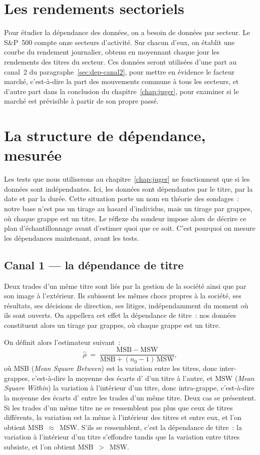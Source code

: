 \section{Les rendements sectoriels}
\label{sec:donnees-secteurs}

Pour étudier la dépendance des données, on a besoin de données par
secteur. Le S\&P~500 compte onze secteurs d'activité. Sur chacun d'eux,
on établit une courbe du rendement journalier, obtenu en moyennant
chaque jour les rendements des titres du secteur. Ces données seront
utilisées d'une part au canal~2 du paragraphe~\ref{sec:dep-canal2}, pour
mettre en évidence le facteur marché, c'est-à-dire la part des
mouvements commune à tous les secteurs, et d'autre part dans la
conclusion du chapitre~\ref{chap:juger}, pour examiner si le marché est
prévisible à partir de son propre passé.

\section{La structure de dépendance, mesurée}
\label{sec:dep-mesuree}

Les tests que nous utiliserons au chapitre~\ref{chap:juger} ne
fonctionnent que si les données sont indépendantes. Ici, les données
sont dépendantes par le titre, par la date et par la durée. Cette
situation porte un nom en théorie des sondages~: notre base n'est pas un
tirage au hasard d'individus, mais un tirage par grappes, où chaque
grappe est un titre. Le réflexe du sondeur impose alors de décrire ce
plan d'échantillonnage avant d'estimer quoi que ce soit. C'est pourquoi
on mesure les dépendances maintenant, avant les tests.

\subsection{Canal 1 --- la dépendance de titre}
\label{sec:dep-canal1}

Deux trades d'un même titre sont liés par la gestion de la société ainsi
que par son image à l'extérieur. Ils subissent les mêmes chocs propres à
la société, ses résultats, ses décisions de direction, ses litiges,
indépendamment du moment où ils sont ouverts. On appellera cet effet la
dépendance de titre~: nos données constituent alors un tirage par
grappes, où chaque grappe est un titre.

On définit alors l'estimateur suivant~:
\[
  \hat\rho \;=\; \frac{\mathrm{MSB}-\mathrm{MSW}}
                      {\mathrm{MSB} + (n_0 - 1)\,\mathrm{MSW}},
\]
où MSB (\emph{Mean Square Between}) est la variation entre les titres,
donc inter-grappes, c'est-à-dire la moyenne des écarts d'\edgevar{} d'un
titre à l'autre, et MSW (\emph{Mean Square Within}) la variation à
l'intérieur d'un titre, donc intra-grappe, c'est-à-dire la moyenne des
écarts d'\edgevar{} entre les trades d'un même titre. Deux cas se
présentent. Si les trades d'un même titre ne se ressemblent pas plus que
ceux de titres différents, la variation est la même à l'intérieur des
titres et entre eux, et l'on obtient MSB~$\approx$~MSW. S'ils se
ressemblent, c'est la dépendance de titre~: la variation à l'intérieur
d'un titre s'effondre tandis que la variation entre titres subsiste, et
l'on obtient MSB~$>$~MSW.

